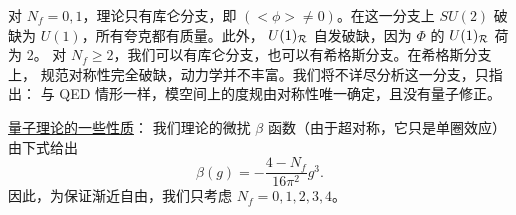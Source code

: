 对 $N_f = 0,1$，理论只有库仑分支，即 $(<\phi>
\not= 0)$。在这一分支上 $SU(2)$ 破缺为 $U(1)$，所有夸克都有质量。此外，
$U(1)_{\cal R}$ 自发破缺，因为 $\Phi$ 的 $U(1)_{\cal R}$ 荷为 $2$。
对 $N_f \geq 2$，我们可以有库仑分支，也可以有希格斯分支。在希格斯分支上，
规范对称性完全破缺，动力学并不丰富。我们将不详尽分析这一分支，只指出：
与 QED 情形一样，模空间上的度规由对称性唯一确定，且没有量子修正。

\noindent\underline{量子理论的一些性质}：
我们理论的微扰 $\beta$ 函数（由于超对称，它只是单圈效应）由下式给出
\begin{equation}
\beta (g) = - \frac{4-N_f}{16\pi^2} g^3.
\label{betanf}
\end{equation}
因此，为保证渐近自由，我们只考虑 $N_f=0,1,2,3,4$。


